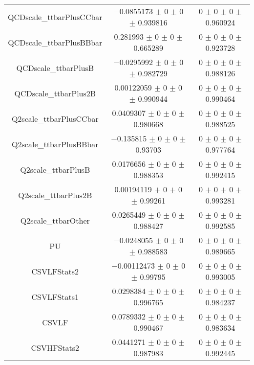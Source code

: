 \begin{table}
\begin{tabular}{ccc}
QCDscale\_ttbarPlusCCbar 	& \num{-0.0855173} $\pm$ \num{0} $\pm$ \num{0} $\pm$ \num{0.939816} 	& \num{0} $\pm$ \num{0} $\pm$ \num{0} $\pm$ \num{0.960924}\\
QCDscale\_ttbarPlusBBbar 	& \num{0.281993} $\pm$ \num{0} $\pm$ \num{0} $\pm$ \num{0.665289} 	& \num{0} $\pm$ \num{0} $\pm$ \num{0} $\pm$ \num{0.923728}\\
QCDscale\_ttbarPlusB 	& \num{-0.0295992} $\pm$ \num{0} $\pm$ \num{0} $\pm$ \num{0.982729} 	& \num{0} $\pm$ \num{0} $\pm$ \num{0} $\pm$ \num{0.988126}\\
QCDscale\_ttbarPlus2B 	& \num{0.00122059} $\pm$ \num{0} $\pm$ \num{0} $\pm$ \num{0.990944} 	& \num{0} $\pm$ \num{0} $\pm$ \num{0} $\pm$ \num{0.990464}\\
Q2scale\_ttbarPlusCCbar 	& \num{0.0409307} $\pm$ \num{0} $\pm$ \num{0} $\pm$ \num{0.980668} 	& \num{0} $\pm$ \num{0} $\pm$ \num{0} $\pm$ \num{0.988525}\\
Q2scale\_ttbarPlusBBbar 	& \num{-0.135815} $\pm$ \num{0} $\pm$ \num{0} $\pm$ \num{0.93703} 	& \num{0} $\pm$ \num{0} $\pm$ \num{0} $\pm$ \num{0.977764}\\
Q2scale\_ttbarPlusB 	& \num{0.0176656} $\pm$ \num{0} $\pm$ \num{0} $\pm$ \num{0.988353} 	& \num{0} $\pm$ \num{0} $\pm$ \num{0} $\pm$ \num{0.992415}\\
Q2scale\_ttbarPlus2B 	& \num{0.00194119} $\pm$ \num{0} $\pm$ \num{0} $\pm$ \num{0.99261} 	& \num{0} $\pm$ \num{0} $\pm$ \num{0} $\pm$ \num{0.993281}\\
Q2scale\_ttbarOther 	& \num{0.0265449} $\pm$ \num{0} $\pm$ \num{0} $\pm$ \num{0.988427} 	& \num{0} $\pm$ \num{0} $\pm$ \num{0} $\pm$ \num{0.992585}\\
PU 	& \num{-0.0248055} $\pm$ \num{0} $\pm$ \num{0} $\pm$ \num{0.988583} 	& \num{0} $\pm$ \num{0} $\pm$ \num{0} $\pm$ \num{0.989665}\\
CSVLFStats2 	& \num{-0.00112473} $\pm$ \num{0} $\pm$ \num{0} $\pm$ \num{0.99795} 	& \num{0} $\pm$ \num{0} $\pm$ \num{0} $\pm$ \num{0.993005}\\
CSVLFStats1 	& \num{0.0298384} $\pm$ \num{0} $\pm$ \num{0} $\pm$ \num{0.996765} 	& \num{0} $\pm$ \num{0} $\pm$ \num{0} $\pm$ \num{0.984237}\\
CSVLF 	& \num{0.0789332} $\pm$ \num{0} $\pm$ \num{0} $\pm$ \num{0.990467} 	& \num{0} $\pm$ \num{0} $\pm$ \num{0} $\pm$ \num{0.983634}\\
CSVHFStats2 	& \num{0.0441271} $\pm$ \num{0} $\pm$ \num{0} $\pm$ \num{0.987983} 	& \num{0} $\pm$ \num{0} $\pm$ \num{0} $\pm$ \num{0.992445}\\

\end{tabular}
\end{table}
